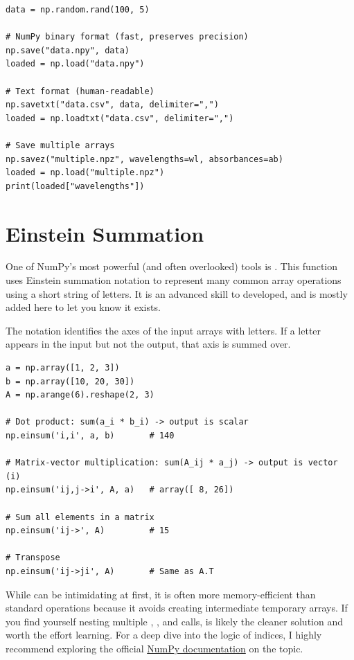 \begin{lstlisting}
data = np.random.rand(100, 5)

# NumPy binary format (fast, preserves precision)
np.save("data.npy", data)
loaded = np.load("data.npy")

# Text format (human-readable)
np.savetxt("data.csv", data, delimiter=",")
loaded = np.loadtxt("data.csv", delimiter=",")

# Save multiple arrays
np.savez("multiple.npz", wavelengths=wl, absorbances=ab)
loaded = np.load("multiple.npz")
print(loaded["wavelengths"])
\end{lstlisting}
\section{Einstein Summation}
\label{subsec:einsum}

One of NumPy's most powerful (and often overlooked) tools is . This function uses Einstein summation notation to represent many common array operations using a short string of letters. It is an advanced skill to developed, and is mostly added here to let you know it exists.

The notation identifies the axes of the input arrays with letters. If a letter appears in the input but not the output, that axis is summed over.

\begin{lstlisting}
a = np.array([1, 2, 3])
b = np.array([10, 20, 30])
A = np.arange(6).reshape(2, 3)

# Dot product: sum(a_i * b_i) -> output is scalar
np.einsum('i,i', a, b)       # 140

# Matrix-vector multiplication: sum(A_ij * a_j) -> output is vector (i)
np.einsum('ij,j->i', A, a)   # array([ 8, 26])

# Sum all elements in a matrix
np.einsum('ij->', A)         # 15

# Transpose
np.einsum('ij->ji', A)       # Same as A.T
\end{lstlisting}

\begin{tip}
While  can be intimidating at first, it is often more memory-efficient than standard operations because it avoids creating intermediate temporary arrays. If you find yourself nesting multiple , , and  calls,  is likely the cleaner solution and worth the effort learning. For a deep dive into the logic of indices, I highly recommend exploring the official \href{https://numpy.org/doc/stable/reference/generated/numpy.einsum.html}{NumPy documentation} on the topic.
\end{tip}
